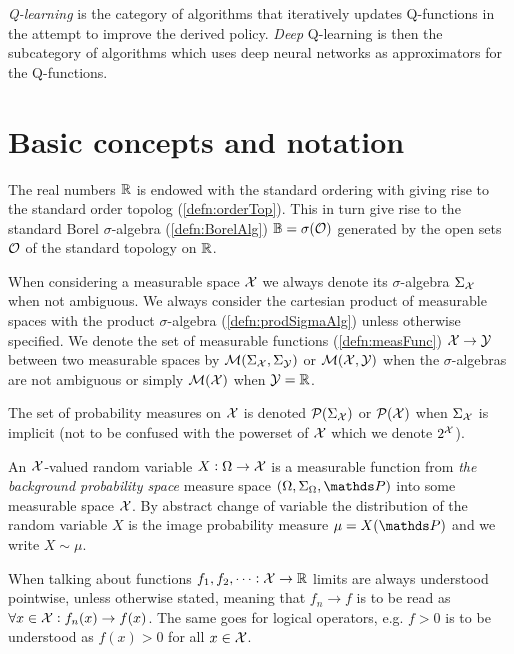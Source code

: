 \emph{Q-learning} is the category of algorithms that iteratively updates
Q-functions in the attempt to improve the derived policy.
\emph{Deep} Q-learning is then the subcategory of algorithms which
uses deep neural networks as approximators for the Q-functions.

\section{Basic concepts and notation}

The real numbers $\mathbb{R}$ is endowed with
the standard ordering with
giving rise to the
standard order topolog
(\cref{defn:orderTop}).
This in turn give rise to the standard Borel $\sigma$-algebra
(\cref{defn:BorelAlg}) $\mathbb{B} = \sigma(\mathcal{O})$
generated by the open sets $\mathcal{O}$ of the standard topology on $\mathbb{R}$.

When considering a measurable space $\mathcal{X}$ 
we always denote its $\sigma$-algebra
$\Sigma_\mathcal{X}$ when not ambiguous.
We always
consider the cartesian product of measurable spaces
with the product $\sigma$-algebra (\cref{defn:prodSigmaAlg})
unless otherwise specified.
We denote the set of measurable functions (\cref{defn:measFunc})
$\mathcal{X} \to \mathcal{Y}$ between two measurable spaces by 
$\mathcal{M}(\Sigma_\mathcal{X}, \Sigma_\mathcal{Y})$ or $\mathcal{M}(\mathcal{X}, \mathcal{Y})$
when the $\sigma$-algebras are not ambiguous
or simply $\mathcal{M}(\mathcal{X})$ when $\mathcal{Y} = \mathbb{R}$.

The set of probability measures on $\mathcal{X}$ is denoted
$\mathcal{P}(\Sigma_\mathcal{X})$ or $\mathcal{P}(\mathcal{X})$ when $\Sigma_\mathcal{X}$ is implicit
(not to be confused with the powerset of $\mathcal{X}$
which we denote $2^{\mathcal{X}}$).

An $\mathcal{X}$-valued random variable $X : \Omega \to \mathcal{X}$ is a
measurable function from \emph{the background probability space}
measure space $(\Omega, \Sigma_\Omega, \Prob)$ into some measurable
space $\mathcal{X}$.
By abstract change of variable the distribution of the random variable $X$
is the image probability measure $\mu = X(\Prob)$ and we write
$X \sim \mu$.

When talking about functions $f_1, f_2, \dots : \mathcal{X} \to \mathbb{R}$
limits are always understood pointwise, unless otherwise stated,
meaning that $f_n \to f$ is to be read as
$\forall x \in \mathcal{X} : f_n(x) \to f(x)$.
The same goes for logical operators, e.g. $f > 0$ is to be understood
as $f(x) > 0$ for all $x \in \mathcal{X}$.




